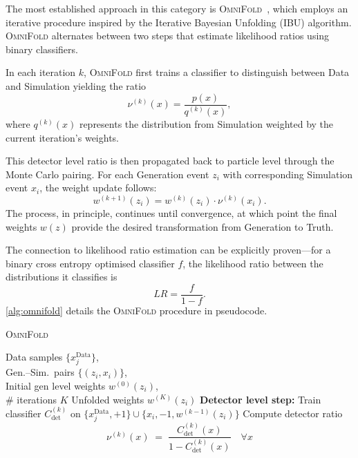             The most established approach in this category is \textsc{OmniFold}~\cite{andreassen_omnifold_2020}, which employs an iterative procedure inspired by the Iterative Bayesian Unfolding (IBU) algorithm.
            \textsc{OmniFold} alternates between two steps that estimate likelihood ratios using binary classifiers.
            
            In each iteration \(k\), \textsc{OmniFold} first trains a classifier to distinguish between Data and Simulation yielding the ratio
            \begin{equation}
                \nu^{(k)}(x) = \frac{p(x)}{q^{(k)}(x)},
            \end{equation}
            where \(q^{(k)}(x)\) represents the distribution from Simulation weighted by the current iteration's weights.

            This detector level ratio is then propagated back to particle level through the Monte Carlo pairing.
            For each Generation event \(z_i\) with corresponding Simulation event \(x_i\), the weight update follows:
            \begin{equation}
                w^{(k+1)}(z_i) = w^{(k)}(z_i) \cdot \nu^{(k)}(x_i).
            \end{equation}
            The process, in principle, continues until convergence, at which point the final weights \(w(z)\) provide the desired transformation from Generation to Truth.
            
            The connection to likelihood ratio estimation can be explicitly proven---for a binary cross entropy optimised classifier \(f\), the likelihood ratio between the distributions it classifies is
            \[
                LR = \frac{f}{1-f}.
            \]
            \cref{alg:omnifold} details the \textsc{OmniFold} procedure in pseudocode.


\begin{algorithm}
  \caption{\textsc{OmniFold}}
  \label{alg:omnifold}
  \begin{algorithmic}[1]
    \Require 
      Data samples $\{x_j^{\mathrm{Data}}\}$,\\
      Gen.--Sim.\ pairs $\{(z_i,x_i)\}$,\\
      Initial gen level weights $w^{(0)}(z_i)$,\\
      \# iterations $K$
    \Ensure 
      Unfolded weights $w^{(K)}(z_i)$
      \State \textbf{Detector level step:}
      \State Train classifier $C_{\text{det}}^{(k)}$ on
        $\{x_j^{\mathrm{Data}},+1\}\cup\{x_i,-1,w^{(k-1)}(z_i)\}$
      \State Compute detector ratio
        \[
          \nu^{(k)}(x)\;=\;\frac{C_{\text{det}}^{(k)}(x)}{1 - C_{\text{det}}^{(k)}(x)}
          \quad\forall x
        \]
    \end{algorithmic}
\end{algorithm}


